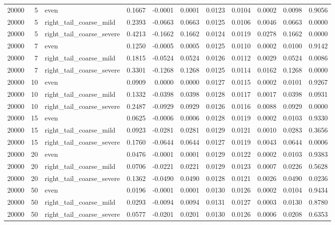 \begin{table}[!h]
{\begin{tabular}[t]{rrlrrrrrrrr}
20000 & 5 & even & 0.1667 & -0.0001 & 0.0001 & 0.0123 & 0.0104 & 0.0002 & 0.0098 & 0.9056\\
20000 & 5 & right\_tail\_coarse\_mild & 0.2393 & -0.0663 & 0.0663 & 0.0125 & 0.0106 & 0.0046 & 0.0663 & 0.0000\\
20000 & 5 & right\_tail\_coarse\_severe & 0.4213 & -0.1662 & 0.1662 & 0.0124 & 0.0119 & 0.0278 & 0.1662 & 0.0000\\
20000 & 7 & even & 0.1250 & -0.0005 & 0.0005 & 0.0125 & 0.0110 & 0.0002 & 0.0100 & 0.9142\\
20000 & 7 & right\_tail\_coarse\_mild & 0.1815 & -0.0524 & 0.0524 & 0.0126 & 0.0112 & 0.0029 & 0.0524 & 0.0086\\
20000 & 7 & right\_tail\_coarse\_severe & 0.3301 & -0.1268 & 0.1268 & 0.0125 & 0.0114 & 0.0162 & 0.1268 & 0.0000\\
20000 & 10 & even & 0.0909 & 0.0000 & 0.0000 & 0.0127 & 0.0115 & 0.0002 & 0.0101 & 0.9267\\
20000 & 10 & right\_tail\_coarse\_mild & 0.1332 & -0.0398 & 0.0398 & 0.0128 & 0.0117 & 0.0017 & 0.0398 & 0.0931\\
20000 & 10 & right\_tail\_coarse\_severe & 0.2487 & -0.0929 & 0.0929 & 0.0126 & 0.0116 & 0.0088 & 0.0929 & 0.0000\\
20000 & 15 & even & 0.0625 & -0.0006 & 0.0006 & 0.0128 & 0.0119 & 0.0002 & 0.0103 & 0.9330\\
20000 & 15 & right\_tail\_coarse\_mild & 0.0923 & -0.0281 & 0.0281 & 0.0129 & 0.0121 & 0.0010 & 0.0283 & 0.3656\\
20000 & 15 & right\_tail\_coarse\_severe & 0.1760 & -0.0644 & 0.0644 & 0.0127 & 0.0119 & 0.0043 & 0.0644 & 0.0006\\
20000 & 20 & even & 0.0476 & -0.0001 & 0.0001 & 0.0129 & 0.0122 & 0.0002 & 0.0103 & 0.9383\\
20000 & 20 & right\_tail\_coarse\_mild & 0.0706 & -0.0221 & 0.0221 & 0.0129 & 0.0123 & 0.0007 & 0.0226 & 0.5628\\
20000 & 20 & right\_tail\_coarse\_severe & 0.1362 & -0.0490 & 0.0490 & 0.0128 & 0.0121 & 0.0026 & 0.0490 & 0.0236\\
20000 & 50 & even & 0.0196 & -0.0001 & 0.0001 & 0.0130 & 0.0126 & 0.0002 & 0.0104 & 0.9434\\
20000 & 50 & right\_tail\_coarse\_mild & 0.0293 & -0.0094 & 0.0094 & 0.0131 & 0.0127 & 0.0003 & 0.0130 & 0.8780\\
20000 & 50 & right\_tail\_coarse\_severe & 0.0577 & -0.0201 & 0.0201 & 0.0130 & 0.0126 & 0.0006 & 0.0208 & 0.6353\\
\bottomrule
\end{tabular}}
\end{table}